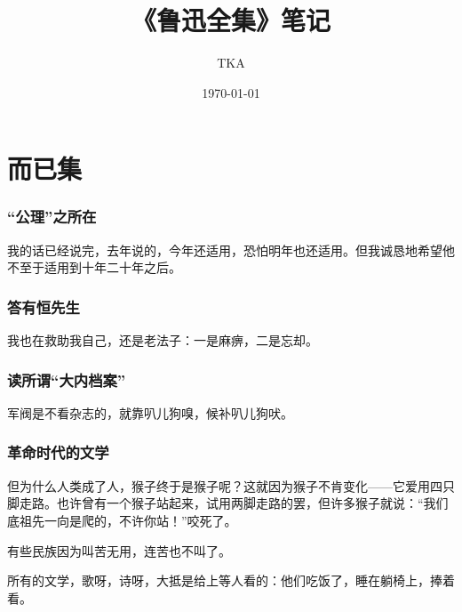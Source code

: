 \documentclass[a4paper]{article}
\title{\heiti\zihao{2} 《鲁迅全集》笔记}
\author{TKA}
\date{\today}
\begin{document}
    \maketitle
    \thispagestyle{empty}

    \newpage

    \setcounter{page}{1}
    \cfoot{\thepage}

    \renewcommand{\footrulewidth}{1pt}
    \tableofcontents

    \newpage


    \setcounter{page}{1}

    \part{而已集}

    \section{“公理”之所在}
    我的话已经说完，去年说的，今年还适用，恐怕明年也还适用。但我诚恳地希望他不至于适用到十年二十年之后。

    \section{答有恒先生}
    我也在救助我自己，还是老法子：一是麻痹，二是忘却。

    \section{读所谓“大内档案”}

    军阀是不看杂志的，就靠叭儿狗嗅，候补叭儿狗吠。

    \section{革命时代的文学}
但为什么人类成了人，猴子终于是猴子呢？这就因为猴子不肯变化——它爱用四只脚走路。也许曾有一个猴子站起来，试用两脚走路的罢，但许多猴子就说：“我们底祖先一向是爬的，不许你站！”咬死了。

有些民族因为叫苦无用，连苦也不叫了。

所有的文学，歌呀，诗呀，大抵是给上等人看的：他们吃饭了，睡在躺椅上，捧着看。
\end{document}
